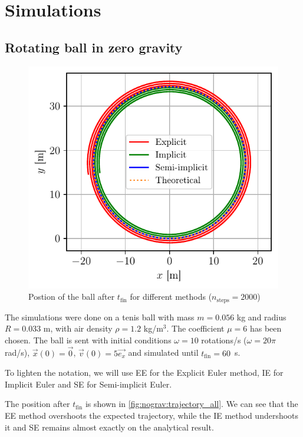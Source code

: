 \section{Simulations}

\subsection{Rotating ball in zero gravity}

\begin{figure}
    \centering
    \includegraphics[width=0.85\linewidth]{figures/nograv_trajectory_all.pdf}
    \caption{Postion of the ball after $t_\textrm{fin}$ for different methods ($n_\textrm{steps} = 2000$)}
    \label{fig:nograv:trajectory_all}
\end{figure}
The simulations were done on a tenis ball with mass $m = 0.056$ kg and radius $R = 0.033$ m, with air density $\rho = 1.2$ kg/m$^3$. The coefficient $\mu = 6$ has been chosen. The ball is sent with initial conditions $\omega = 10$ rotations/s ($\omega = 20\pi$ rad/s), $\vec{x}(0) = \vec{0}$, $\vec{v}(0) = 5 \vec{e_x}$ and simulated until \mbox{$t_\textrm{fin} = 60$ s}.

To lighten the notation, we will use EE for the Explicit Euler method, IE for Implicit Euler and SE for Semi-implicit Euler.

The position after $t_\textrm{fin}$ is shown in \autoref{fig:nograv:trajectory_all}. We can see that the EE method overshoots the expected trajectory, while the IE method undershoots it and SE remains almost exactly on the analytical result.

